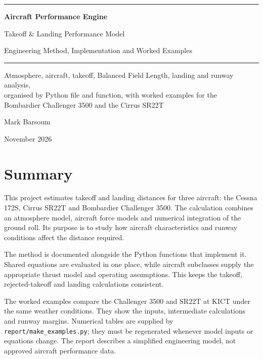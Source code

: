\documentclass[11pt,letterpaper]{article}
\numberwithin{equation}{section}
\newcommand{\code}[1]{\textmd{\texttt{#1}}}
\begin{document}
\begin{titlepage}
\centering
\vspace*{2.2in}
{\color{navy}\rule{\linewidth}{1.5pt}}\par\vspace{0.6em}
{\LARGE\bfseries\color{navy} Aircraft Performance Engine\par}
\vspace{0.5em}
{\Large\color{navy} Takeoff \& Landing Performance Model\par}
\vspace{0.7em}
{\large Engineering Method, Implementation and Worked Examples\par}
\vspace{0.4em}
{\color{navy}\rule{\linewidth}{1.5pt}}\par
\vspace{0.6in}
{\normalsize Atmosphere, aircraft, takeoff, Balanced Field Length, landing and runway analysis,\\
organised by Python file and function, with worked examples for the\\
Bombardier Challenger 3500 and the Cirrus SR22T\par}
\vfill
{\large Mark Barsoum\par}
\vspace{0.4in}
{\normalsize November 2026\par}
\end{titlepage}

\section*{Summary}

This project estimates takeoff and landing distances for three aircraft: the Cessna 172S, Cirrus SR22T and Bombardier Challenger 3500. The calculation combines an atmosphere model, aircraft force models and numerical integration of the ground roll. Its purpose is to study how aircraft characteristics and runway conditions affect the distance required.

The method is documented alongside the Python functions that implement it. Shared equations are evaluated in one place, while aircraft subclasses supply the appropriate thrust model and operating assumptions. This keeps the takeoff, rejected-takeoff and landing calculations consistent.

The worked examples compare the Challenger 3500 and SR22T at KICT under the same weather conditions. They show the inputs, intermediate calculations and runway margins. Numerical tables are supplied by \code{report/make\_examples.py}; they must be regenerated whenever model inputs or equations change. The report describes a simplified engineering model, not approved aircraft performance data.
\end{document}
